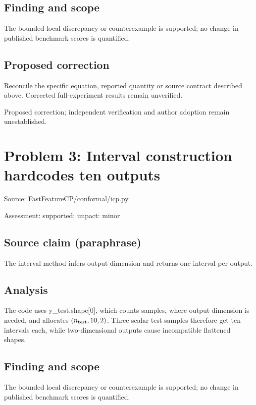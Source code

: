 \documentclass[11pt]{article}
\begin{document}
\subsection*{Finding and scope}

The bounded local discrepancy or counterexample is supported; no change in published benchmark scores is quantified.

\subsection*{Proposed correction}

Reconcile the specific equation, reported quantity or source contract described above. Corrected full-experiment results remain unverified.

Proposed correction; independent verification and author adoption remain unestablished.

\section*{Problem 3: Interval construction hardcodes ten outputs}

Source: FastFeatureCP/conformal/icp.py

Assessment: supported; impact: minor

\subsection*{Source claim (paraphrase)}

The interval method infers output dimension and returns one interval per output.

\subsection*{Analysis}

The code uses y\_test.shape[\(0\)], which counts samples, where output dimension is needed, and allocates \((n_{\rm test},10,2)\). Three scalar test samples therefore get ten intervals each, while two-dimensional outputs cause incompatible flattened shapes.

\subsection*{Finding and scope}

The bounded local discrepancy or counterexample is supported; no change in published benchmark scores is quantified.
\end{document}
